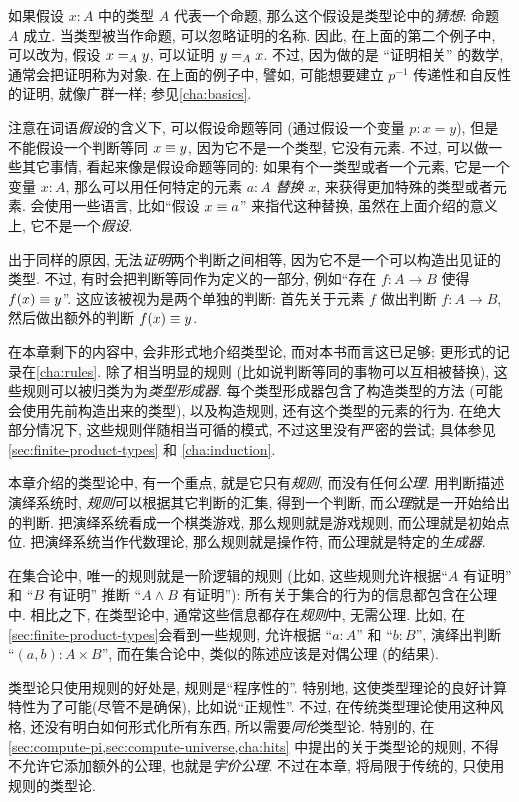 如果假设 $x:A$ 中的类型 $A$ 代表一个命题, 那么这个假设是类型论中的\emph{猜想}:
%
命题 $A$ 成立.
当类型被当作命题, 可以忽略证明的名称.
因此, 在上面的第二个例子中, 可以改为, 假设 $\id[A]{x}{y}$, 可以证明 $\id[A]{y}{x}$.
不过, 因为做的是 ``证明相关'' 的数学,
%
通常会把证明称为对象.
在上面的例子中, 譬如, 可能想要建立 $p^{-1}$ 传递性和自反性的证明, 就像广群一样;
参见\cref{cha:basics}.

注意在词语\emph{假设}的含义下, 可以假设命题等同 (通过假设一个变量 $p:x=y$), 但是不能假设一个判断等同 $x\jdeq y$, 因为它不是一个类型, 它没有元素.
不过, 可以做一些其它事情, 看起来像是假设命题等同的: 如果有个一类型或者一个元素, 它是一个变量 $x:A$, 那么可以用任何特定的元素 $a:A$ \emph{替换} $x$, 来获得更加特殊的类型或者元素.
会使用一些语言, 比如``假设 $x\jdeq a$'' 来指代这种替换, 虽然在上面介绍的意义上, 它不是一个\emph{假设}.

出于同样的原因, 无法\emph{证明}两个判断之间相等, 因为它不是一个可以构造出见证的类型.
不过, 有时会把判断等同作为定义的一部分, 例如``存在 $f:A\to B$ 使得 $f(x)\jdeq y$''.
这应该被视为是两个单独的判断: 首先关于元素 $f$ 做出判断  $f:A\to B$, 然后做出额外的判断 $f(x)\jdeq y$.

在本章剩下的内容中, 会非形式地介绍类型论, 而对本书而言这已足够;
更形式的记录在\cref{cha:rules}.
除了相当明显的规则 (比如说判断等同的事物可以互相被替换), 这些规则可以被归类为为\emph{类型形成器}.
每个类型形成器包含了构造类型的方法 (可能会使用先前构造出来的类型), 以及构造规则, 还有这个类型的元素的行为.
在绝大部分情况下, 这些规则伴随相当可循的模式, 不过这里没有严密的尝试;
具体参见 \cref{sec:finite-product-types} 和 \cref{cha:induction}.
%

%
%
本章介绍的类型论中, 有一个重点, 就是它只有\emph{规则}, 而没有任何\emph{公理}.
用判断描述演绎系统时, \emph{规则}可以根据其它判断的汇集, 得到一个判断, 而\emph{公理}就是一开始给出的判断.
把演绎系统看成一个棋类游戏, 那么规则就是游戏规则, 而公理就是初始点位.
把演绎系统当作代数理论, 那么规则就是操作符, 而公理就是特定的\emph{生成器}.

在集合论中, 唯一的规则就是一阶逻辑的规则 (比如, 这些规则允许根据``$A$ 有证明'' 和 ``$B$ 有证明'' 推断 ``$A\wedge B$ 有证明''): 所有关于集合的行为的信息都包含在公理中.
相比之下, 在类型论中, 通常这些信息都存在\emph{规则}中, 无需公理.
比如, 在\cref{sec:finite-product-types}会看到一些规则, 允许根据 ``$a:A$'' 和 ``$b:B$'', 演绎出判断 ``$(a,b):A\times B$'', 而在集合论中, 类似的陈述应该是对偶公理 (的结果).

类型论只使用规则的好处是, 规则是``程序性的''.
特别地, 这使类型理论的良好计算特性为了可能(尽管不是确保), 比如说``正规性''.
%
不过, 在传统类型理论使用这种风格, 还没有明白如何形式化所有东西, 所以需要\emph{同伦}类型论.
特别的, 在\cref{sec:compute-pi,sec:compute-universe,cha:hits} 中提出的关于类型论的规则, 不得不允许它添加额外的公理, 也就是\emph{宇价公理}.
不过在本章, 将局限于传统的, 只使用规则的类型论.